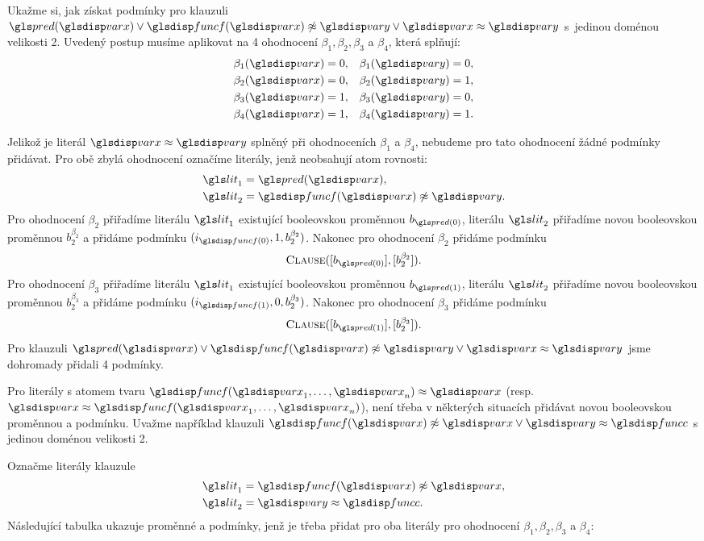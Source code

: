 {Ukažme si, jak získat podmínky pro klauzuli
$\pred(\var) \vee \func(\var) \not\approx \varY \vee \var \approx \varY$
s~jedinou doménou velikosti 2. Uvedený postup musíme
aplikovat na 4 ohodnocení $\beta_1, \beta_2, \beta_3$ a $\beta_4$,
která splňují:
\begin{align*}
\beta_1(\var) &= 0, & \beta_1(\varY) &= 0, \\
\beta_2(\var) &= 0, & \beta_2(\varY) &= 1, \\
\beta_3(\var) &= 1, & \beta_3(\varY) &= 0, \\
\beta_4(\var) &= 1, & \beta_4(\varY) &= 1.
\end{align*}

Jelikož je literál $\var \approx \varY$ splněný při ohodnoceních
$\beta_1$ a $\beta_4$, nebudeme pro tato ohodnocení žádné podmínky přidávat.
Pro obě zbylá ohodnocení označíme literály, jenž neobsahují
atom rovnosti:
\begin{align*}
\lit_1 &= \pred(\var), \\
\lit_2 &= \func(\var) \not\approx \varY.
\end{align*}
Pro ohodnocení $\beta_2$ přiřadíme literálu $\lit_1$
existující booleovskou proměnnou $b_{\pred(0)}$, literálu $\lit_2$
přiřadíme novou booleovskou proměnnou $b_2^{\beta_2}$
a přidáme podmínku \Eq$(i_{\func(0)}, 1, b_2^{\beta_2})$.
Nakonec pro ohodnocení $\beta_2$ přidáme podmínku
\[
  \Clause([b_{\pred(0)}], [b_2^{\beta_2}]).
\]
Pro ohodnocení $\beta_3$ přiřadíme literálu $\lit_1$
existující booleovskou proměnnou $b_{\pred(1)}$, literálu $\lit_2$
přiřadíme novou booleovskou proměnnou $b_2^{\beta_3}$
a přidáme podmínku \Eq$(i_{\func(1)}, 0, b_2^{\beta_3})$.
Nakonec pro ohodnocení $\beta_3$ přidáme podmínku
\[
  \Clause([b_{\pred(1)}], [b_2^{\beta_3}]).
\]
Pro klauzuli
$\pred(\var) \vee \func(\var) \not\approx \varY \vee \var \approx \varY$
jsme dohromady přidali 4 podmínky.

Pro literály s atomem tvaru
$\func(\var_1 \comdots \var_n) \approx \var$ (resp.
$\var \approx \func(\var_1 \comdots \var_n)$), není třeba
v některých situacích přidávat novou booleovskou proměnnou
a podmínku. Uvažme například klauzuli
$\func(\var) \not\approx \var \vee \varY \approx \funcC$
s jedinou doménou velikosti 2.

Označme literály klauzule
\begin{align*}
\lit_1 &= \func(\var) \not\approx \var, \\
\lit_2 &= \varY \approx \funcC.
\end{align*}
Následující tabulka ukazuje proměnné a podmínky,
jenž je třeba přidat pro oba literály pro ohodnocení
$\beta_1, \beta_2, \beta_3$ a $\beta_4$:

}
